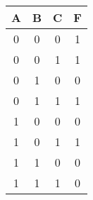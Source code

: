 \begin{tabular}{c|c|c|c}
    A & B & C & F \\
    \hline
    0 & 0 & 0 & 1 \\
    \hline
    0 & 0 & 1 & 1 \\
    \hline
    0 & 1 & 0 & 0 \\
    \hline
    0 & 1 & 1 & 1 \\
    \hline
    1 & 0 & 0 & 0 \\
    \hline
    1 & 0 & 1 & 1 \\
    \hline
    1 & 1 & 0 & 0 \\
    \hline
    1 & 1 & 1 & 0 \\
    \hline
\end{tabular}

